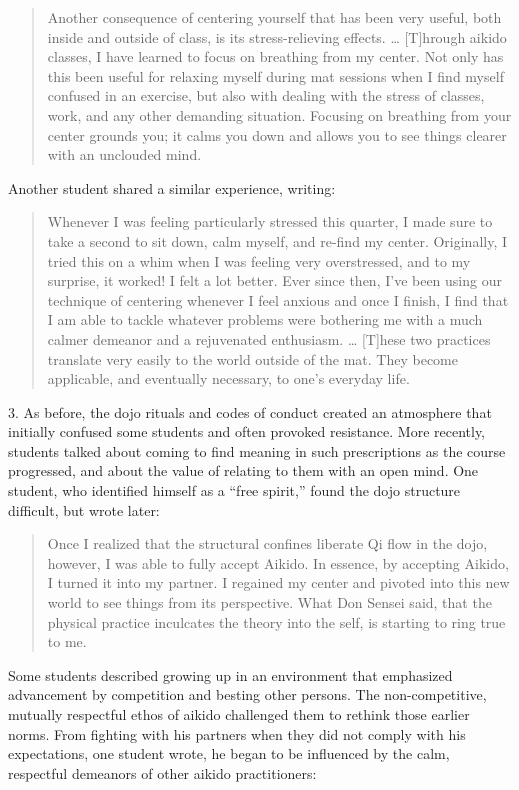 \begin{quote}
Another consequence of centering yourself that has been very useful, both inside and outside of class, is its stress-relieving effects. \ldots{} [T]hrough aikido classes, I have learned to focus on breathing from my center. Not only has this been useful for relaxing myself during mat sessions when I find myself confused in an exercise, but also with dealing with the stress of classes, work, and any other demanding situation. Focusing on breathing from your center grounds you; it calms you down and allows you to see things clearer with an unclouded mind.
\end{quote}

Another student shared a similar experience, writing:

\begin{quote}
Whenever I was feeling particularly stressed this quarter, I made sure to take a second to sit down, calm myself, and re-find my center. Originally, I tried this on a whim when I was feeling very overstressed, and to my surprise, it worked! I felt a lot better. Ever since then, I've been using our technique of centering whenever I feel anxious and once I finish, I find that I am able to tackle whatever problems were bothering me with a much calmer demeanor and a rejuvenated enthusiasm. \ldots{} [T]hese two practices translate very easily to the world outside of the mat. They become applicable, and eventually necessary, to one's everyday life.
\end{quote}

3. As before, the dojo rituals and codes of conduct created an atmosphere that initially confused some students and often provoked resistance. More recently, students talked about coming to find meaning in such prescriptions as the course progressed, and about the value of relating to them with an open mind. One student, who identified himself as a ``free spirit,'' found the dojo structure difficult, but wrote later:

\begin{quote}
Once I realized that the structural confines liberate Qi flow in the dojo, however, I was able to fully accept Aikido. In essence, by accepting Aikido, I turned it into my partner. I regained my center and pivoted into this new world to see things from its perspective. What Don Sensei said, that the physical practice inculcates the theory into the self, is starting to ring true to me.
\end{quote}
 
Some students described growing up in an environment that emphasized advancement by competition and besting other persons. The non-competitive, mutually respectful ethos of aikido challenged them to rethink those earlier norms. From fighting with his partners when they did not comply with his expectations, one student wrote, he began to be influenced by the calm, respectful demeanors of other aikido practitioners:

